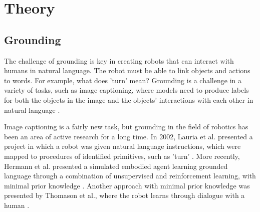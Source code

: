 \chapter{Theory}
\section{Grounding}
The challenge of grounding is key in creating robots that can interact with humans in natural language. The robot must be able to link objects and actions to words. For example, what does 'turn' mean? Grounding is a challenge in a variety of tasks, such as image captioning, where models need to produce labels for both the objects in the image and the objects' interactions with each other in natural language \cite{karpathy2014captioning}.

Image captioning is a fairly new task, but grounding in the field of robotics has been an area of active research for a long time. In 2002, Lauria et al. presented a project in which a robot was given natural language instructions, which were mapped to procedures of identified primitives, such as 'turn' \cite{lauria2002}. More recently, Hermann et al. presented a simulated embodied agent learning grounded language through a combination of unsupervised and reinforcement learning, with minimal prior knowledge \cite{hermann2017grounded}. Another approach with minimal prior knowledge was presented by Thomason et al., where the robot learns through dialogue with a human \cite{thomason2019grounded}.

